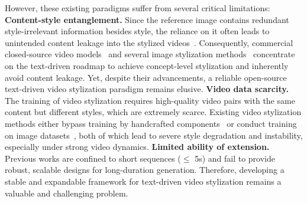 \documentclass[runningheads]{llncs}
\begin{document}
However, these existing paradigms suffer from several critical limitations: 
\textbf{Content-style entanglement.} Since the reference image contains redundant style-irrelevant information besides style, the reliance on it often leads to unintended content leakage into the stylized videos~\cite{clipstyler,ipadapter}. Consequently, commercial closed-source video models~\cite{seedance2.0, Kling-O1} and several image stylization methods~\cite{clipstyler,nameyourstyle,suresh2024fastclipstyler} concentrate on the text-driven roadmap to achieve concept-level stylization and inherently avoid content leakage. Yet, despite their advancements, a reliable open-source text-driven video stylization paradigm remains elusive.
\textbf{Video data scarcity.} The training of video stylization requires high-quality video pairs with the same content but different styles, which are extremely scarce. Existing video stylization methods either bypass training by handcrafted components~\cite{kuanyv2v,xu2025freevis,song2025univst} or conduct training on image datasets~\cite{still,liu2023stylecrafter,ye2025stylemaster}, both of which lead to severe style degradation and instability, especially under strong video dynamics.
\textbf{Limited ability of extension.} Previous works are confined to short sequences ($\le$ 5s) and fail to provide robust, scalable designs for long-duration generation. Therefore, developing a stable and expandable framework for text-driven video stylization remains a valuable and challenging problem.
\end{document}
